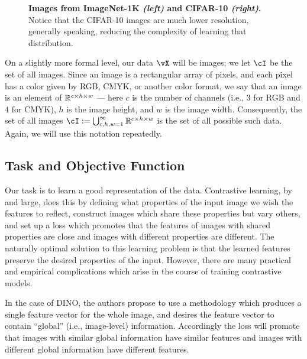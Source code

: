 \documentclass[../../book-main.tex]{subfiles}
\begin{document}
\begin{figure}
    \caption{\small\textbf{Images from ImageNet-1K \textit{(left)} and CIFAR-10 \textit{(right)}.} Notice that the CIFAR-10 images are much lower resolution, generally speaking, reducing the complexity of learning that distribution.}
    \label{fig:in1k_cifar10_examples}
\end{figure}

On a slightly more formal level, our data \(\vX\) will be images; we let \(\cI\) be the set of all images. Since an image is a rectangular array of pixels, and each pixel has a color given by RGB, CMYK, or another color format, we say that an image is an element of \(\mathbb{R}^{c \times h \times w}\) --- here \(c\) is the number of channels (i.e., \(3\) for RGB and \(4\) for CMYK), \(h\) is the image height, and \(w\) is the image width. Consequently, the set of all images \(\cI := \bigcup_{c, h, w = 1}^{\infty}\R^{c \times h \times w}\) is the set of all possible such data. Again, we will use this notation repeatedly.


\subsection{Task and Objective Function} \label{sub:contrastive_learning_objective}

Our task is to learn a good representation of the data. Contrastive learning, by and large, does this by defining what properties of the input image we wish the features to reflect, construct images which share these properties but vary others, and set up a loss which promotes that the features of images with shared properties are close and images with different properties are different. The naturally optimal solution to this learning problem is that the learned features preserve the desired properties of the input. However, there are many practical and empirical complications which arise in the course of training contrastive models.

In the case of DINO, the authors propose to use a methodology which produces a single feature vector for the whole image, and desires the feature vector to contain ``global'' (i.e., image-level) information. Accordingly the loss will promote that images with similar global information have similar features and images with different global information have different features.
\end{document}
